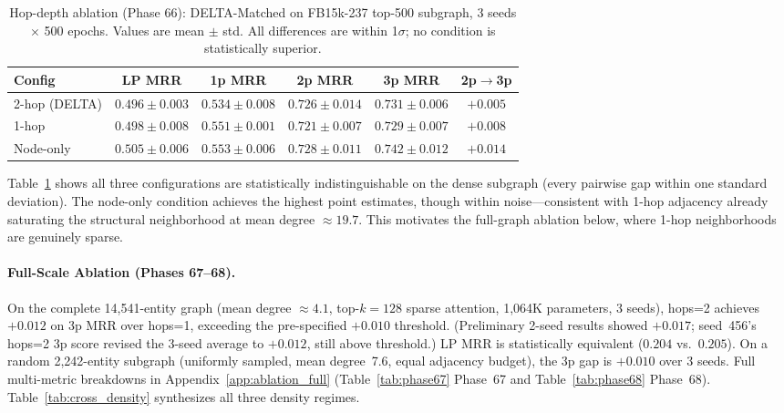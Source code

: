 \documentclass{article}
\begin{document}
\begin{table}[t]
\centering
\caption{Hop-depth ablation (Phase 66): DELTA-Matched on FB15k-237 top-500 subgraph, 3 seeds $\times$ 500 epochs. Values are mean $\pm$ std. All differences are within 1$\sigma$; no condition is statistically superior.}
\label{tab:ablation_hop}
\begin{tabular}{@{}lccccc@{}}
\toprule
\textbf{Config} & \textbf{LP MRR} & \textbf{1p MRR} & \textbf{2p MRR} & \textbf{3p MRR} & \textbf{2p$\to$3p} \\
\midrule
2-hop (DELTA)  & $0.496\pm0.003$ & $0.534\pm0.008$ & $0.726\pm0.014$ & $0.731\pm0.006$ & $+0.005$ \\
1-hop          & $0.498\pm0.008$ & $0.551\pm0.001$ & $0.721\pm0.007$ & $0.729\pm0.007$ & $+0.008$ \\
Node-only      & $0.505\pm0.006$ & $0.553\pm0.006$ & $0.728\pm0.011$ & $0.742\pm0.012$ & $+0.014$ \\
\bottomrule
\end{tabular}
\end{table}

Table~\ref{tab:ablation_hop} shows all three configurations are statistically indistinguishable on the dense subgraph (every pairwise gap within one standard deviation). The node-only condition achieves the highest point estimates, though within noise---consistent with 1-hop adjacency already saturating the structural neighborhood at mean degree $\approx 19.7$. This motivates the full-graph ablation below, where 1-hop neighborhoods are genuinely sparse.

\paragraph{Full-Scale Ablation (Phases 67--68).}
On the complete 14,541-entity graph (mean degree $\approx 4.1$, top-$k{=}128$ sparse attention, 1,064K parameters, 3 seeds), hops=2 achieves $\mathbf{+0.012}$ on 3p MRR over hops=1, exceeding the pre-specified $+0.010$ threshold. (Preliminary 2-seed results showed $+0.017$; seed~456's hops=2 3p score revised the 3-seed average to $+0.012$, still above threshold.) LP MRR is statistically equivalent ($0.204$ vs.\ $0.205$). On a random 2,242-entity subgraph (uniformly sampled, mean degree~7.6, equal adjacency budget), the 3p gap is $+0.010$ over 3 seeds. Full multi-metric breakdowns in Appendix~\ref{app:ablation_full} (Table~\ref{tab:phase67} Phase~67 and Table~\ref{tab:phase68} Phase~68). Table~\ref{tab:cross_density} synthesizes all three density regimes.
\end{document}
